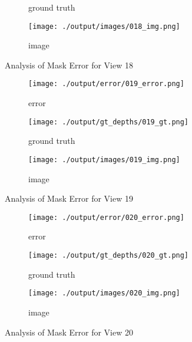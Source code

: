 \documentclass{article}
\begin{document}
\begin{figure}
\begin{subfigure}{0.3\textwidth}
		\caption{ground truth}
		\label{fig:gt18}
	\end{subfigure}
	\hfill
	\centering
	\begin{subfigure}{0.3\textwidth}
		\centering
		\texttt{[image: ./output/images/018\_img.png]}
		\caption{image}
		\label{fig:img18}
	\end{subfigure}
	\hfill
	\caption{Analysis of Mask Error for View 18}
	\label{fig:error_analys18}
\end{figure}\begin{figure}
	\centering
	\begin{subfigure}{0.3\textwidth}
		\centering
		\texttt{[image: ./output/error/019\_error.png]}
		\caption{error}
		\label{fig:error19}
	\end{subfigure}
	\hfill
	\centering
	\begin{subfigure}{0.3\textwidth}
		\centering
		\texttt{[image: ./output/gt\_depths/019\_gt.png]}
		\caption{ground truth}
		\label{fig:gt19}
	\end{subfigure}
	\hfill
	\centering
	\begin{subfigure}{0.3\textwidth}
		\centering
		\texttt{[image: ./output/images/019\_img.png]}
		\caption{image}
		\label{fig:img19}
	\end{subfigure}
	\hfill
	\caption{Analysis of Mask Error for View 19}
	\label{fig:error_analys19}
\end{figure}\begin{figure}
	\centering
	\begin{subfigure}{0.3\textwidth}
		\centering
		\texttt{[image: ./output/error/020\_error.png]}
		\caption{error}
		\label{fig:error20}
	\end{subfigure}
	\hfill
	\centering
	\begin{subfigure}{0.3\textwidth}
		\centering
		\texttt{[image: ./output/gt\_depths/020\_gt.png]}
		\caption{ground truth}
		\label{fig:gt20}
	\end{subfigure}
	\hfill
	\centering
	\begin{subfigure}{0.3\textwidth}
		\centering
		\texttt{[image: ./output/images/020\_img.png]}
		\caption{image}
		\label{fig:img20}
	\end{subfigure}
	\hfill
	\caption{Analysis of Mask Error for View 20}
	\label{fig:error_analys20}
\end{figure}\begin{figure}
	\centering
	\begin{subfigure}{0.3\textwidth}

\end{subfigure}
\end{figure}
\end{document}
